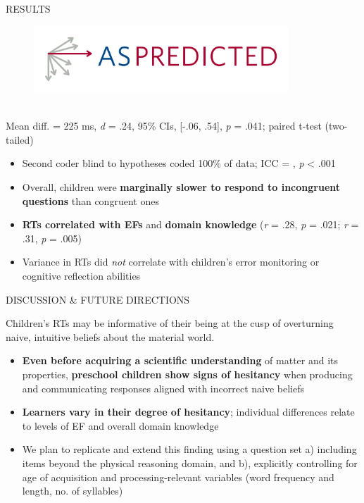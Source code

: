 \documentclass[final]{beamer}
\newlength{\colwidth}
\newlength{\widecolwidth}
\begin{document}
\begin{frame}[t]
\begin{columns}[t]
\begin{column}{\widecolwidth}
\begin{block}{RESULTS}
\begin{minipage}{0.45\textwidth}
\begin{figure}
      \href{https://aspredicted.org/DJG_YWR}{\includegraphics[height=2.5cm]{images/aspredicted.png}}
\end{figure}
\\[2ex]
Mean diff. = 225 ms, \emph{d}  = .24, 95\% CIs, [-.06, .54], \emph{p} = .041; paired t-test (two-tailed)\\[2ex]
    \begin{itemize}
        \item Second coder blind to hypotheses coded 100\% of data; ICC = , \emph{p} < .001
        \item Overall, children were \textbf{marginally slower to respond to incongruent questions} than congruent ones
        \item \textbf{RTs correlated with EFs} and \textbf{domain knowledge} (\emph{r} = .28, \emph{p} = .021; \emph{r} = .31, \emph{p} = .005)
        \item Variance in RTs did \emph{not} correlate with children's error monitoring or cognitive reflection abilities
    \end{itemize}
\end{minipage}
\end{block}
    
\begin{block}{DISCUSSION \& FUTURE DIRECTIONS}
	\begin{tcolorbox}[
		colback=mycolor,
		colframe=mycolor,
		boxsep=2pt,
		left=2mm,
		right=2mm,
		top=2mm,
		bottom=2mm,
		arc=5mm,
		auto outer arc,
		boxrule=4pt,
		width=\dimexpr\linewidth-2\fboxsep\relax,
		]
		\centering
		Children's RTs may be informative of their being at the cusp of overturning naive, intuitive beliefs about the material world.
	\end{tcolorbox}
	
    \begin{itemize}
      \item \textbf{Even before acquiring a scientific understanding} of matter and its properties, \textbf{preschool children show signs of hesitancy} when producing and communicating responses aligned with incorrect naive beliefs
      \item \textbf{Learners vary in their degree of hesitancy}; individual differences relate to levels of EF and overall domain knowledge
      \item We plan to replicate and extend this finding using a question set a) including items beyond the physical reasoning domain, and b), explicitly controlling for age of acquisition and processing-relevant variables (word frequency and length, no. of syllables)
    \end{itemize}
\end{block}


\end{column}
\end{columns}
\end{frame}
\end{document}
